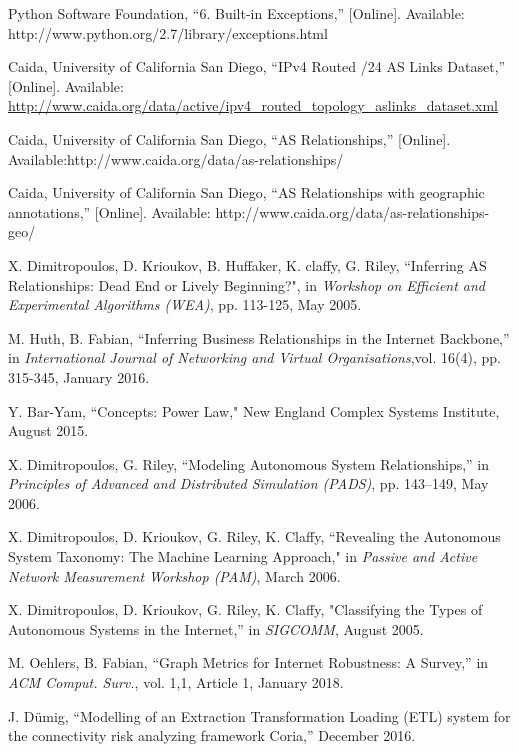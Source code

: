 \documentclass[conference, 11pt]{IEEEtran}
\begin{document}
\begin{thebibliography}{00}
Python Software Foundation, ``6. Built-in Exceptions,'' [Online]. Available: http://www.python.org/2.7/library/exceptions.html %

 Caida, University of California San Diego, ``IPv4 Routed /24 AS Links Dataset,'' [Online]. Available: \url{http://www.caida.org/data/active/ipv4\_routed\_topology\_aslinks\_dataset.xml} %

Caida, University of California San Diego, ``AS Relationships,'' [Online]. Available:http://www.caida.org/data/as-relationships/ %

Caida, University of California San Diego, ``AS Relationships with geographic annotations,'' [Online]. Available: http://www.caida.org/data/as-relationships-geo/ %

 X. Dimitropoulos, D. Krioukov, B. Huffaker, K. claffy, G. Riley, ``Inferring AS Relationships: Dead End or Lively Beginning?", in \textit{Workshop on Efficient and Experimental Algorithms (WEA)}, pp. 113-125, May 2005. %

 M. Huth, B. Fabian, ``Inferring Business Relationships in the Internet Backbone,'' in \textit{International Journal of Networking and Virtual Organisations},vol. 16(4), pp. 315-345, January 2016. %

 Y. Bar-Yam, ``Concepts: Power Law," New England Complex Systems Institute, August 2015. %

X. Dimitropoulos, G. Riley, ``Modeling Autonomous System Relationships,'' in \textit{Principles of Advanced and Distributed Simulation (PADS)}, pp. 143--149, May 2006. %

X. Dimitropoulos, D. Krioukov, G. Riley, K. Claffy, ``Revealing the Autonomous System Taxonomy: The Machine Learning Approach," in \textit{Passive and Active Network Measurement Workshop (PAM)}, March 2006. %

X. Dimitropoulos, D. Krioukov, G. Riley, K. Claffy, "Classifying the Types of Autonomous Systems in the Internet,'' in \textit{SIGCOMM}, August 2005. %

M. Oehlers, B. Fabian, ``Graph Metrics for Internet Robustness: A Survey,'' in \textit{ACM Comput. Surv.}, vol. 1,1, Article 1, January 2018. %

J. Dümig, ``Modelling of an Extraction Transformation Loading (ETL) system for the connectivity risk analyzing framework Coria,'' December 2016. %


\end{thebibliography}
\end{document}
